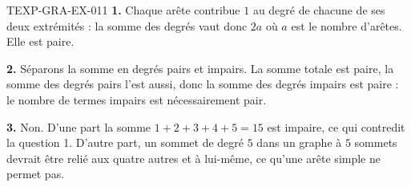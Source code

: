 \begin{corrige}{TEXP-GRA-EX-011}
\textbf{1.} Chaque arête contribue $1$ au degré de chacune de ses deux
extrémités : la somme des degrés vaut donc $2a$ où $a$ est le nombre
d'arêtes. Elle est paire.

\textbf{2.} Séparons la somme en degrés pairs et impairs. La somme totale est
paire, la somme des degrés pairs l'est aussi, donc la somme des degrés impairs
est paire : le nombre de termes impairs est nécessairement pair.

\textbf{3.} Non. D'une part la somme $1+2+3+4+5=15$ est impaire, ce qui
contredit la question 1. D'autre part, un sommet de degré $5$ dans un graphe à
$5$ sommets devrait être relié aux quatre autres et à lui-même, ce qu'une
arête simple ne permet pas.
\end{corrige}
